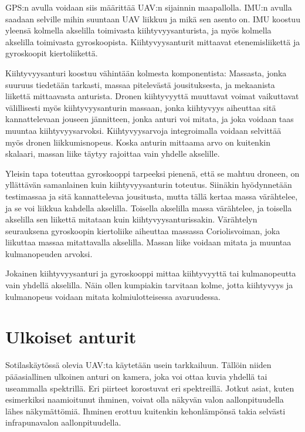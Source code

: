 GPS:n avulla voidaan siis määrittää UAV:n sijainnin maapallolla. IMU:n avulla
saadaan selville mihin suuntaan UAV liikkuu ja mikä sen asento on.  IMU koostuu
yleensä kolmella akselilla toimivasta kiihtyvyysanturista, ja myös kolmella
akselilla toimivasta gyroskoopista. Kiihtyvyysanturit mittaavat
etenemisliikettä ja gyroskoopit kiertoliikettä.~\cite{Mems2017}

Kiihtyvyysanturi koostuu vähintään kolmesta komponentista: Massasta, jonka
suuruus tiedetään tarkasti, massaa pitelevästä jousituksesta, ja mekaanista
liikettä mittaavasta anturista. Dronen kiihtyvyyttä muuttavat voimat
vaikuttavat välillisesti myös kiihtyvyysanturin massaan, jonka kiihtyvyys
aiheuttaa sitä kannattelevaan jouseen jännitteen, jonka anturi voi mitata, ja
joka voidaan taas muuntaa kiihtyvyysarvoksi. Kiihtyvyysarvoja integroimalla
voidaan selvittää myös dronen liikkumisnopeus. Koska anturin mittaama arvo on
kuitenkin skalaari, massan liike täytyy rajoittaa vain yhdelle
akselille.~\cite{Mems2017}

Yleisin tapa toteuttaa gyroskooppi tarpeeksi pienenä, että se mahtuu droneen,
on yllättävän samanlainen kuin kiihtyvyysanturin toteutus. Siinäkin
hyödynnetään testimassaa ja sitä kannattelevaa jousitusta, mutta tällä kertaa
massa värähtelee, ja se voi liikkua kahdella akselilla. Toisella akselilla massa
värähtelee, ja toisella akselilla sen liikettä mitataan kuin
kiihtyvyysanturissakin. Värähtelyn seurauksena gyroskoopin kiertoliike
aiheuttaa massassa Coriolisvoiman, joka liikuttaa massaa mitattavalla
akselilla. Massan liike voidaan mitata ja muuntaa kulmanopeuden
arvoksi.~\cite{Mems2017}

Jokainen kiihtyvyysanturi ja gyroskooppi mittaa kiihtyvyyttä tai kulmanopeutta
vain yhdellä akselilla. Näin ollen kumpiakin tarvitaan kolme, jotta kiihtyvyys
ja kulmanopeus voidaan mitata kolmiulotteisessa avaruudessa.~\cite{Mems2017}

\section{Ulkoiset anturit}
Sotilaskäytössä olevia UAV:ta käytetään usein tarkkailuun. Tällöin niiden
pääasiallinen ulkoinen anturi on kamera, joka voi ottaa kuvia yhdellä tai
useammalla spektrillä. Eri piirteet korostuvat eri spektreillä. Jotkut asiat,
kuten esimerkiksi naamioitunut ihminen, voivat olla näkyvän valon
aallonpituudella lähes näkymättömiä. Ihminen erottuu kuitenkin kehonlämpönsä
takia selvästi infrapunavalon aallonpituudella.~\cite{Modest2013}

